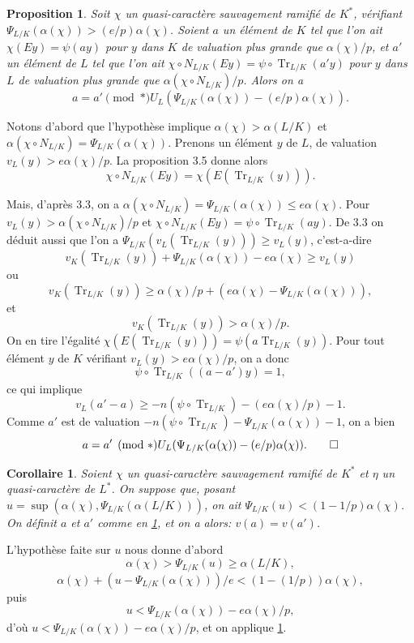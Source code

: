 \documentclass[12pt,a4paper]{article}
\theoremstyle{plain}
\newtheorem{proposition}[theorem]{Proposition}
\newtheorem{corollary}[theorem]{Corollaire}
\theoremstyle{definition}
\theoremstyle{remark}
\DeclareMathOperator{\Tr}{Tr}
\providecommand{\Tr}{\operatorname{Tr}}
\begin{document}
\begin{proposition}\label{prop:3.6}
Soit $\chi$ un quasi-caract\`ere sauvagement ramifi\'e de $K^*$, v\'erifiant $\Psi_{L/K}(\alpha(\chi)) > (e/p) \alpha(\chi)$. Soient $a$ un \'el\'ement de $K$ tel que l'on ait $\chi(Ey) = \psi(ay)$ pour $y$ dans $K$ de valuation plus grande que $\alpha(\chi)/p$, et $a'$ un \'el\'ement de $L$ tel que l'on ait $\chi \circ N_{L/K}(Ey) = \psi \circ \Tr_{L/K}(a'y)$ pour $y$ dans $L$ de valuation plus grande que $\alpha(\chi \circ N_{L/K})/p$. Alors on a
\[
a = a' \pmod{*} U_L(\Psi_{L/K}(\alpha(\chi)) - (e/p) \alpha(\chi)).
\]
\end{proposition}

Notons d'abord que l'hypoth\`ese implique $\alpha(\chi) > \alpha(L/K)$ et $\alpha(\chi \circ N_{L/K}) = \Psi_{L/K}(\alpha(\chi))$. Prenons un \'el\'ement $y$ de $L$, de valuation $v_L(y) > e\alpha(\chi)/p$. La proposition 3.5 donne alors
\[
\chi \circ N_{L/K}(Ey) = \chi(E(\Tr_{L/K}(y))).
\]

Mais, d'apr\`es 3.3, on a $\alpha(\chi \circ N_{L/K}) = \Psi_{L/K}(\alpha(\chi)) \leq e\alpha(\chi)$. Pour $v_L(y) > \alpha(\chi \circ N_{L/K})/p$ et $\chi \circ N_{L/K}(Ey) = \psi \circ \Tr_{L/K}(a y)$. De 3.3 on d\'eduit aussi que l'on a $\Psi_{L/K}(v_L(\Tr_{L/K}(y))) \geq v_L(y)$, c'est-a-dire
\[
v_K(\Tr_{L/K}(y)) + \Psi_{L/K}(\alpha(\chi)) - e\alpha(\chi) \geq v_L(y)
\]
ou
\[
v_K(\Tr_{L/K}(y)) \geq \alpha(\chi)/p + (e\alpha(\chi) - \Psi_{L/K}(\alpha(\chi))),
\]
et
\[
v_K(\Tr_{L/K}(y)) > \alpha(\chi)/p.
\]
On en tire l'\'egalit\'e $\chi(E(\Tr_{L/K}(y))) = \psi(a \Tr_{L/K}(y))$. Pour tout \'el\'ement $y$ de $K$ v\'erifiant $v_L(y) > e\alpha(\chi)/p$, on a donc
\[
\psi \circ \Tr_{L/K}((a-a')y) = 1,
\]
ce qui implique
\[
v_L(a'-a) \geq -n(\psi \circ \Tr_{L/K}) - (e\alpha(\chi)/p) - 1.
\]
Comme $a'$ est de valuation $-n(\psi \circ \Tr_{L/K}) - \Psi_{L/K}(\alpha(\chi)) - 1$, on a bien
\[
a = a' \pmod{*} U_L(\Psi_{L/K}(\alpha(\chi)) - (e/p) \alpha(\chi)). \qedhere
\]

\begin{corollary}\label{cor:3.7}
Soient $\chi$ un quasi-caract\`ere sauvagement ramifi\'e de $K^*$ et $\eta$ un quasi-caract\`ere de $L^*$. On suppose que, posant $u = \sup(\alpha(\chi), \Psi_{L/K}(\alpha(L/K)))$, on ait $\Psi_{L/K}(u) < (1-1/p) \alpha(\chi)$. On d\'efinit $a$ et $a'$ comme en \ref{prop:3.6}, et on a alors: $v(a) = v(a')$.
\end{corollary}

L'hypoth\`ese faite sur $u$ nous donne d'abord
\[
\alpha(\chi) > \Psi_{L/K}(u) \geq \alpha(L/K),
\]
\[
\alpha(\chi) + (u - \Psi_{L/K}(\alpha(\chi)))/e < (1 - (1/p)) \alpha(\chi),
\]
puis
\[
u < \Psi_{L/K}(\alpha(\chi)) - e\alpha(\chi)/p,
\]
d'o\`u $u < \Psi_{L/K}(\alpha(\chi)) - e\alpha(\chi)/p$, et on applique \ref{prop:3.6}.
\end{document}
